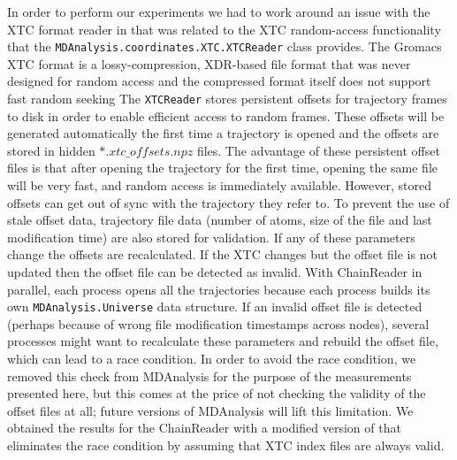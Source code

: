 In order to perform our experiments we had to work around an issue with the XTC format reader in  that was related to the XTC random-access functionality that the \texttt{MDAnalysis.coordinates.XTC.XTCReader} class provides.
The Gromacs XTC format \citep{Lindahl01, Spangberg:2011zr} is a lossy-compression, XDR-based file format that was never designed for random access and the compressed format itself does not support fast random seeking
The \texttt{XTCReader} stores persistent offsets for trajectory frames to disk \citep{Gowers:2016aa} in order to enable efficient access to random frames.
These offsets will be generated automatically the first time a trajectory is opened and the offsets are stored in hidden $\ast.xtc\_offsets.npz$ files. 
The advantage of these persistent offset files is that after opening the trajectory for the first time, opening the same file will be very fast, and random access is immediately available. 
However, stored offsets can get out of sync with the trajectory they refer to. 
To prevent the use of stale offset data, trajectory file data (number of atoms, size of the file and last modification time) are also stored for validation.
If any of these parameters change the offsets are recalculated. 
If the XTC changes but the offset file is not updated then the offset file can be detected as invalid.
With ChainReader in parallel, each process opens all the trajectories because each process builds its own \texttt{MDAnalysis.Universe} data structure.
If an invalid offset file is detected (perhaps because of wrong file modification timestamps across nodes), several processes might want to recalculate these parameters and rebuild the offset file, which can lead to a race condition.
In order to avoid the race condition, we removed this check from MDAnalysis for the purpose of the measurements presented here, but this comes at the price of not checking the validity of the offset files at all; future versions of MDAnalysis will lift this limitation.  
We obtained the results for the ChainReader with a modified version of  that eliminates the race condition by assuming that XTC index files are always valid.

